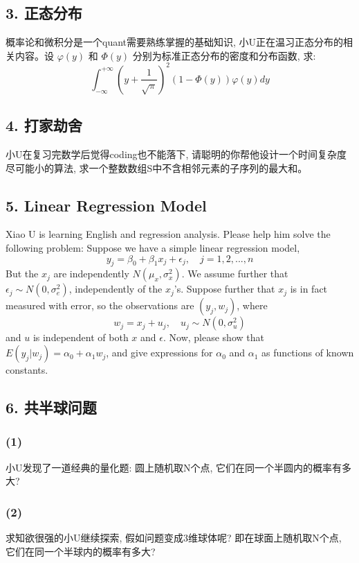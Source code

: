 \documentclass[UTF8]{ctexart}
\begin{document}
\subsection*{3. 正态分布}
概率论和微积分是一个quant需要熟练掌握的基础知识, 小U正在温习正态分布的相关内容。设 $\varphi(y)$ 和 $\Phi(y)$ 分别为标准正态分布的密度和分布函数, 求:
$$
\int_{-\infty}^{+\infty}{\left(y+\frac{1}{\sqrt{\pi}}\right)^{2}(1-\Phi(y))\varphi(y)dy}
$$

\subsection*{4. 打家劫舍}
小U在复习完数学后觉得coding也不能落下, 请聪明的你帮他设计一个时间复杂度尽可能小的算法, 求一个整数数组S中不含相邻元素的子序列的最大和。

\subsection*{5. Linear Regression Model}
Xiao U is learning English and regression analysis. Please help him solve the following problem:
Suppose we have a simple linear regression model,
$$ y_{j}=\beta_{0}+\beta_{1}x_{j}+\epsilon_{j}, \quad j=1,2,...,n $$
But the $x_{j}$ are independently $N(\mu_{x},\sigma_{x}^{2})$. We assume further that $\epsilon_{j}\sim N(0,\sigma_{e}^{2})$, independently of the $x_{j}$'s.
Suppose further that $x_{j}$ is in fact measured with error, so the observations are $(y_{j},w_{j})$, where
$$ w_{j}=x_{j}+u_{j}, \quad u_{j}\sim N(0,\sigma_{u}^{2}) $$
and $u$ is independent of both $x$ and $\epsilon$.
Now, please show that $E(y_{j}|w_{j})=\alpha_{0}+\alpha_{1}w_{j}$, and give expressions for $\alpha_{0}$ and $\alpha_{1}$ as functions of known constants.

\subsection*{6. 共半球问题}
\subsubsection*{(1)}
小U发现了一道经典的量化题: 圆上随机取N个点, 它们在同一个半圆内的概率有多大?

\subsubsection*{(2)}
求知欲很强的小U继续探索, 假如问题变成3维球体呢? 即在球面上随机取N个点, 它们在同一个半球内的概率有多大?
\end{document}
